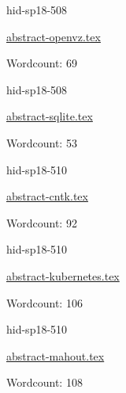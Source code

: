 

\begin{IU}

hid-sp18-508

\href{https://github.com/cloudmesh-community/hid-sp18-508/blob/master//technology/abstract-openvz.tex}{abstract-openvz.tex}

 

Wordcount: 69

\end{IU}



\begin{IU}

hid-sp18-508

\href{https://github.com/cloudmesh-community/hid-sp18-508/blob/master//technology/abstract-sqlite.tex}{abstract-sqlite.tex}

 

Wordcount: 53

\end{IU}



\begin{IU}

hid-sp18-510

\href{https://github.com/cloudmesh-community/hid-sp18-510/blob/master//technology/abstract-cntk.tex}{abstract-cntk.tex}

 

Wordcount: 92

\end{IU}



\begin{IU}

hid-sp18-510

\href{https://github.com/cloudmesh-community/hid-sp18-510/blob/master//technology/abstract-kubernetes.tex}{abstract-kubernetes.tex}

 

Wordcount: 106

\end{IU}



\begin{IU}

hid-sp18-510

\href{https://github.com/cloudmesh-community/hid-sp18-510/blob/master//technology/abstract-mahout.tex}{abstract-mahout.tex}

 

Wordcount: 108

\end{IU}

